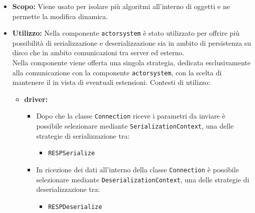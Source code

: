 \documentclass{scalatekids-article}
\begin{document}
\begin{itemize}
\item \textbf{Scopo:} Viene usato per isolare più algoritmi all'interno di oggetti e
  ne permette la modifica dinamica.
\item \textbf{Utilizzo:} Nella componente \verb=actorsystem= è stato utilizzato
  per offrire più possibilità di serializzazione e deserializzazione sia in
  ambito di persistenza su disco che in ambito comunicazioni tra server ed
  esterno.\\ Nella componente  viene offerta una singola
  strategia, dedicata esclusivamente alla comunicazione con la componente
  \verb=actorsystem=, con la scelta di mantenere il  in
  vista di eventuali estensioni. Contesti di utilizzo:
  \begin{itemize}

  \item \textbf{driver:}
    \begin{itemize}
    \item Dopo che la classe \verb=Connection= riceve i parametri da inviare è
      possibile selezionare mediante \verb=SerializationContext=, una delle
      strategie di serializzazione tra:
      \begin{itemize}
      \item \verb=RESPSerialize=
      \end{itemize}
    \end{itemize}
    \begin{itemize}
    \item In ricezione dei dati all'interno della classe \verb=Connection= è
      possibile selezionare mediante \verb=DeserializationContext=, una delle
      strategie di deserializzazione tra:
      \begin{itemize}
      \item \verb=RESPDeserialize=
      \end{itemize}
    \end{itemize}


\end{itemize}
\end{itemize}
\end{document}
